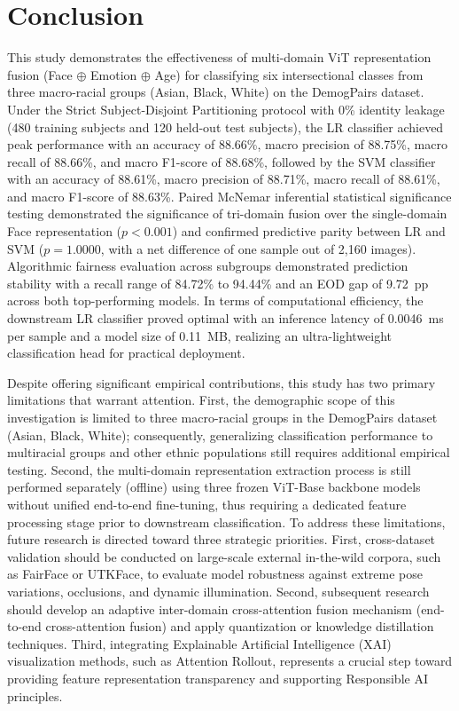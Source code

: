 \section{Conclusion}
\label{sec:conclusion}

This study demonstrates the effectiveness of multi-domain ViT representation fusion (Face $\oplus$ Emotion $\oplus$ Age) for classifying six intersectional classes from three macro-racial groups (Asian, Black, White) on the DemogPairs dataset. Under the Strict Subject-Disjoint Partitioning protocol with 0\% identity leakage (480 training subjects and 120 held-out test subjects), the LR classifier achieved peak performance with an accuracy of 88.66\%, macro precision of 88.75\%, macro recall of 88.66\%, and macro F1-score of 88.68\%, followed by the SVM classifier with an accuracy of 88.61\%, macro precision of 88.71\%, macro recall of 88.61\%, and macro F1-score of 88.63\%. Paired McNemar inferential statistical significance testing demonstrated the significance of tri-domain fusion over the single-domain Face representation ($p < 0.001$) and confirmed predictive parity between LR and SVM ($p = 1.0000$, with a net difference of one sample out of 2,160 images). Algorithmic fairness evaluation across subgroups demonstrated prediction stability with a recall range of 84.72\% to 94.44\% and an EOD gap of 9.72~pp across both top-performing models. In terms of computational efficiency, the downstream LR classifier proved optimal with an inference latency of 0.0046~ms per sample and a model size of 0.11~MB, realizing an ultra-lightweight classification head for practical deployment.

Despite offering significant empirical contributions, this study has two primary limitations that warrant attention. First, the demographic scope of this investigation is limited to three macro-racial groups in the DemogPairs dataset (Asian, Black, White); consequently, generalizing classification performance to multiracial groups and other ethnic populations still requires additional empirical testing. Second, the multi-domain representation extraction process is still performed separately (offline) using three frozen ViT-Base backbone models without unified end-to-end fine-tuning, thus requiring a dedicated feature processing stage prior to downstream classification. To address these limitations, future research is directed toward three strategic priorities. First, cross-dataset validation should be conducted on large-scale external in-the-wild corpora, such as FairFace or UTKFace, to evaluate model robustness against extreme pose variations, occlusions, and dynamic illumination. Second, subsequent research should develop an adaptive inter-domain cross-attention fusion mechanism (end-to-end cross-attention fusion) and apply quantization or knowledge distillation techniques. Third, integrating Explainable Artificial Intelligence (XAI) visualization methods, such as Attention Rollout, represents a crucial step toward providing feature representation transparency and supporting Responsible AI principles.

